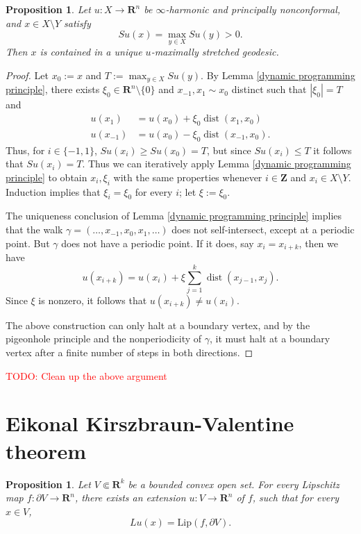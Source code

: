 \documentclass[reqno,11pt]{amsart}
\newcommand{\ZZ}{\mathbf{Z}}
\newcommand{\RR}{\mathbf{R}}
\DeclareMathOperator{\dist}{dist}
\newcommand{\Lip}{\mathrm{Lip}}
\newtheorem{proposition}[theorem]{Proposition}
\theoremstyle{definition}
\numberwithin{equation}{section}
\newcommand\todo[1]{\textcolor{red}{TODO: #1}}
\begin{document}
\begin{proposition}
Let $u: X \to \RR^n$ be $\infty$-harmonic and principally nonconformal, and $x \in X \setminus Y$ satisfy
$$Su(x) = \max_{y \in X} Su(y) > 0.$$
Then $x$ is contained in a unique $u$-maximally stretched geodesic.
\end{proposition}
\begin{proof}
Let $x_0 := x$ and $T := \max_{y \in X} Su(y)$.
By Lemma \ref{dynamic programming principle}, there exists $\xi_0 \in \RR^n \setminus \{0\}$ and $x_{-1}, x_1 \sim x_0$ distinct such that $|\xi_0| = T$ and 
\begin{align*}
u(x_1) &= u(x_0) + \xi_0 \dist(x_1, x_0) \\  
u(x_{-1}) &= u(x_0) - \xi_0 \dist(x_{-1}, x_0).
\end{align*}
Thus, for $i \in \{-1, 1\}$, $Su(x_i) \geq Su(x_0) = T$, but since $Su(x_i) \leq T$ it follows that $Su(x_i) = T$.
Thus we can iteratively apply Lemma \ref{dynamic programming principle} to obtain $x_i, \xi_i$ with the same properties whenever $i \in \ZZ$ and $x_i \in X \setminus Y$.
Induction implies that $\xi_i = \xi_0$ for every $i$; let $\xi := \xi_0$.

The uniqueness conclusion of Lemma \ref{dynamic programming principle} implies that the walk $\gamma = (\dots, x_{-1}, x_0, x_1, \dots)$ does not self-intersect, except at a periodic point.
But $\gamma$ does not have a periodic point.
If it does, say $x_i = x_{i + k}$, then we have
$$u(x_{i + k}) = u(x_i) + \xi \sum_{j=1}^k \dist(x_{j - 1}, x_j).$$
Since $\xi$ is nonzero, it follows that $u(x_{i + k}) \neq u(x_i)$.

The above construction can only halt at a boundary vertex, and by the pigeonhole principle and the nonperiodicity of $\gamma$, it must halt at a boundary vertex after a finite number of steps in both directions.
\end{proof}

\todo{Clean up the above argument}

\section{Eikonal Kirszbraun-Valentine theorem}
\begin{proposition}\label{eikonal extension}
Let $V \Subset \RR^k$ be a bounded convex open set.
For every Lipschitz map $f: \partial V \to \RR^n$, there exists an extension $u: V \to \RR^n$ of $f$, such that for every $x \in V$,
$$Lu(x) = \Lip(f, \partial V).$$
\end{proposition}
\end{document}
